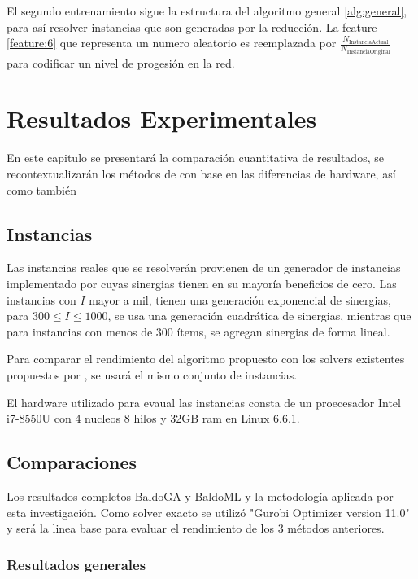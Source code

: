 \documentclass[spanish, a4paper, 12pt, openany,final]{book}
\begin{document}
El segundo entrenamiento sigue la estructura del algoritmo general \ref{alg:general}, para así resolver instancias que son generadas por la reducción. La feature \ref{feature:6} que representa un numero aleatorio es reemplazada por $\frac{N_{\text{InstanciaActual}}}{N_{\text{InstanciaOriginal}}}$ para codificar un nivel de progesión en la red.

 
\clearpage
\chapter{Resultados Experimentales}
En este capitulo se presentará la comparación cuantitativa de resultados, se recontextualizarán los métodos de \cite{baldo_polynomial_2023} con base en las diferencias de hardware, así como también

\section{Instancias}

Las instancias reales que se resolverán provienen de un generador de instancias implementado por \cite{baldo_polynomial_2023} cuyas sinergias tienen en su mayoría beneficios de cero. Las instancias con $I$ mayor a mil, tienen una generación exponencial de sinergias, para $300 \le I \le 1000$, se usa una generación cuadrática de sinergias, mientras que para instancias con menos de 300 ítems, se agregan sinergias de forma lineal.

Para comparar el rendimiento del algoritmo propuesto con los solvers existentes propuestos por \cite{baldo_polynomial_2023}, se usará el mismo conjunto de instancias.

El hardware utilizado para evaual las instancias consta de un proecesador Intel i7-8550U con 4 nucleos 8 hilos y 32GB ram en Linux 6.6.1.


\section{Comparaciones}

Los resultados completos  BaldoGA y BaldoML y la metodología aplicada por esta investigación. Como solver exacto se utilizó "Gurobi Optimizer version 11.0" y será la linea base para evaluar el rendimiento de los 3 métodos anteriores.

\subsection*{Resultados generales}
\end{document}
